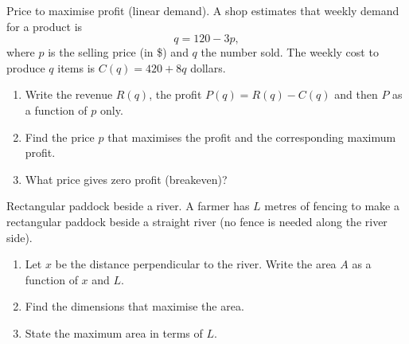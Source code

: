 \documentclass[11pt]{article}
\def\textbf#1{#1}%
\newcounter{question}
\begin{document}
\begin{question}
\textbf{Price to maximise profit (linear demand).}
A shop estimates that weekly demand for a product is
\[
q=120-3p,
\]
where $p$ is the selling price (in \$) and $q$ the number sold. The weekly cost to produce $q$ items is $C(q)=420+8q$ dollars.
\begin{enumerate}
  \item Write the revenue $R(q)$, the profit $P(q)=R(q)-C(q)$ and then $P$ as a function of $p$ only.
  \item Find the price $p$ that maximises the profit and the corresponding maximum profit.
  \item What price gives zero profit (breakeven)?
\end{enumerate}

\begin{center}
\end{center}
\end{question}

\begin{question}
\textbf{Rectangular paddock beside a river.}
A farmer has $L$ metres of fencing to make a rectangular paddock beside a straight river (no fence is needed along the river side).
\begin{enumerate}
  \item Let $x$ be the distance perpendicular to the river. Write the area $A$ as a function of $x$ and $L$.
  \item Find the dimensions that maximise the area.
  \item State the maximum area in terms of $L$.
\end{enumerate}

\begin{center}
\end{center}
\end{question}
\end{document}
